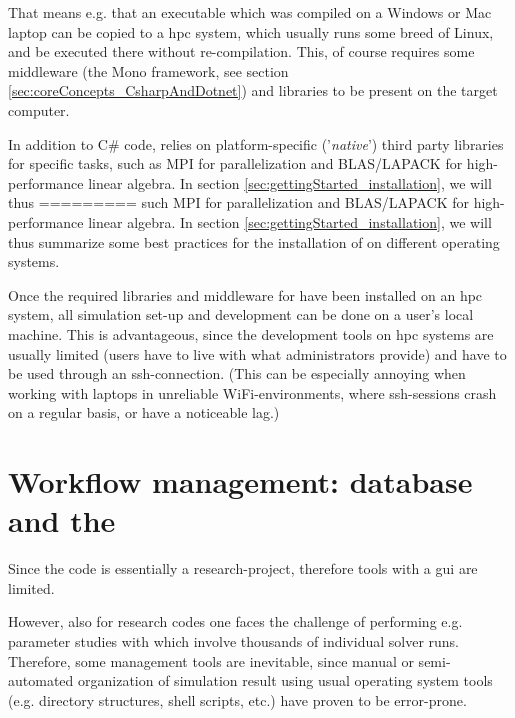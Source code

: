 \documentclass[a4paper,10pt]{report} %
\begin{document}
That means e.g. that an executable which was compiled on a Windows or Mac laptop can be copied 
to a \ac{hpc} system, which usually runs some breed of Linux, and be executed there without re-compilation.
This, of course requires some middleware (the Mono framework, see section \ref{sec:coreConcepts_CsharpAndDotnet})
and libraries to be present on the target computer.

In addition to C\# code,  \BoSSS{} relies on platform-specific ('\emph{native}') third party libraries for specific tasks, 
such as MPI for parallelization and BLAS/LAPACK for high-performance linear algebra. In 
section \ref{sec:gettingStarted_installation}, we will thus 
=========
such MPI for parallelization and BLAS/LAPACK for high-performance linear algebra. In 
section \ref{sec:gettingStarted_installation}, we will thus 
summarize some best practices for the installation of \BoSSS{} on different operating systems.

Once the required libraries and middleware for \BoSSS{} have been installed on an 
\ac{hpc} system, all simulation set-up and development can be done 
on a user's local machine.
This is advantageous, since the development tools on \ac{hpc} systems are usually limited
(users have to live with what administrators provide)
and have to be used through an ssh-connection.
(This can be especially annoying when working with laptops in unreliable WiFi-environments,
where ssh-sessions crash on a regular basis, or have a noticeable lag.)

\section{Workflow management: database and the \BoSSSpad}
\label{sec:coreConcepts_BoSSSpad}
Since the \BoSSS{} code is essentially a research-project, therefore 
tools with a \ac{gui}  are limited.

However, also for research codes  one faces the challenge of performing 
e.g. parameter studies with which involve thousands of individual 
solver runs.
Therefore, some management tools are inevitable, since manual or semi-automated
organization of simulation result using usual operating system tools (e.g. 
directory structures, shell scripts, etc.) have proven to be error-prone.
\end{document}
